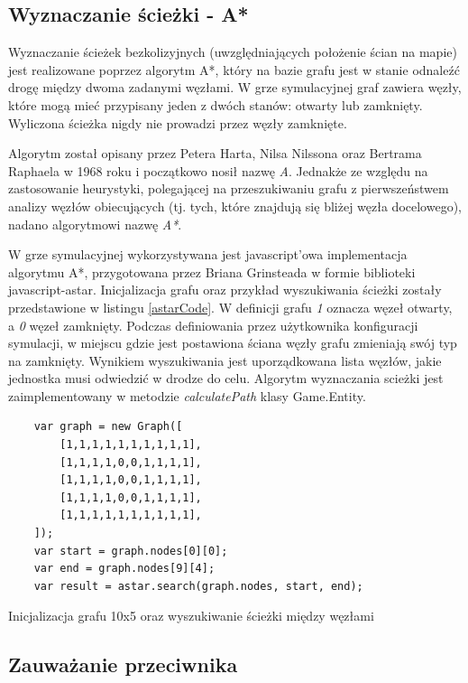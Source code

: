 \subsection{Wyznaczanie ścieżki - A*}\label{graph}
Wyznaczanie ścieżek bezkolizyjnych (uwzględniających położenie ścian na mapie) jest realizowane poprzez algorytm A*, który na bazie grafu jest w stanie odnaleźć drogę między dwoma zadanymi węzłami. W grze symulacyjnej graf zawiera węzły, które mogą mieć przypisany jeden z dwóch stanów: otwarty lub zamknięty. Wyliczona ścieżka nigdy nie prowadzi przez węzły zamknięte.

Algorytm został opisany przez Petera Harta, Nilsa Nilssona oraz Bertrama Raphaela w 1968 roku i początkowo nosił nazwę \emph{A}. Jednakże ze względu na zastosowanie heurystyki, polegającej na przeszukiwaniu grafu z pierwszeństwem analizy węzłów obiecujących (tj. tych, które znajdują się bliżej węzła docelowego), nadano algorytmowi nazwę \emph{A*}.

W grze symulacyjnej wykorzystywana jest javascript'owa implementacja algorytmu A*, przygotowana przez Briana Grinsteada w formie biblioteki javascript-astar\cite{astarPage}. Inicjalizacja grafu oraz przykład wyszukiwania ścieżki zostały przedstawione w listingu \ref{astarCode}. W definicji grafu \emph{1} oznacza węzeł otwarty, a \emph{0} węzeł zamknięty. Podczas definiowania przez użytkownika konfiguracji symulacji, w miejscu gdzie jest postawiona ściana węzły grafu zmieniają swój typ na zamknięty. Wynikiem wyszukiwania jest uporządkowana lista węzłów, jakie jednostka musi odwiedzić w drodze do celu. Algorytm wyznaczania scieżki jest zaimplementowany w metodzie \emph{calculatePath} klasy Game.Entity.

\begin{table}
\begin{center}
\begin{lstlisting}
	var graph = new Graph([
		[1,1,1,1,1,1,1,1,1,1],
		[1,1,1,1,0,0,1,1,1,1],
		[1,1,1,1,0,0,1,1,1,1],
		[1,1,1,1,0,0,1,1,1,1],
		[1,1,1,1,1,1,1,1,1,1],
	]);
	var start = graph.nodes[0][0];
	var end = graph.nodes[9][4];
	var result = astar.search(graph.nodes, start, end);
 \end{lstlisting}
\caption {Inicjalizacja grafu 10x5 oraz wyszukiwanie ścieżki między węzłami}
\label{astarCode}
\end{center}
\end{table}

\subsection{Zauważanie przeciwnika}\label{detectionSubsection}

